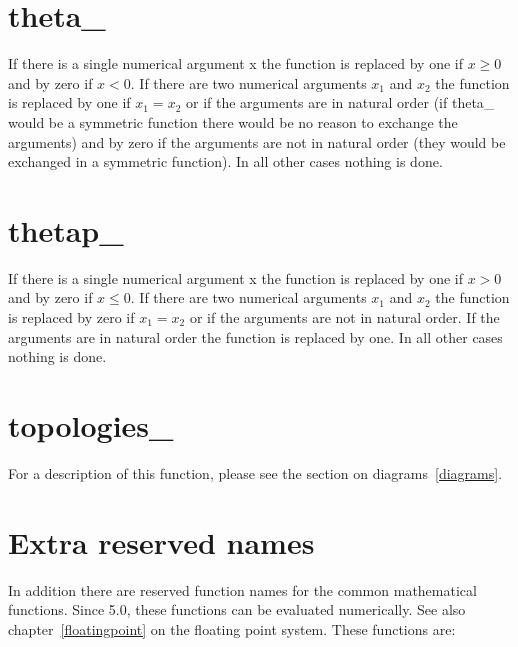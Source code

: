 
\section{theta\_}
\label{funtheta}
\noindent If there is a single numerical argument x the function is 
replaced by one if $x \ge 0$ and by zero if $x < 0$. If there are two 
numerical arguments $x_1$ and $x_2$ the function is replaced by one if $x_1 
= x_2$ or if the arguments are in natural order (if theta\_ would be a 
symmetric function there would be no reason to exchange the arguments) and 
by zero if the arguments are not in natural order (they would be exchanged 
in a symmetric function). In all other cases nothing is done.


\section{thetap\_}
\label{funthetap}
\noindent If there is a single numerical argument x the function is 
replaced by one if $x > 0$ and by zero if $x \le 0$. If there are two 
numerical arguments $x_1$ and $x_2$ the function is replaced by zero if $x_1 
= x_2$ or if the arguments are not in natural order. If the arguments are 
in natural order the function is replaced by one. In all other cases 
nothing is done.


\section{topologies\_}
\label{funtopologies}
\noindent For a description of this function, please see the section on 
diagrams~\ref{diagrams}.



\section{Extra reserved names}

\noindent In addition there are reserved function names for the common 
mathematical functions. Since \FORM{} 5.0, these functions can be 
evaluated numerically. See also chapter~\ref{floatingpoint} on the 
floating point system. These functions are:

